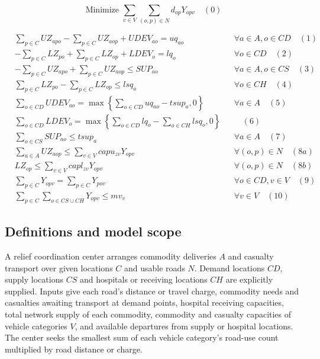 \documentclass[10pt]{article}
\begin{document}
\[
\text{Minimize } \sum_{v \in V} \sum_{(o,p) \in N} d_{op} Y_{opv} \quad (0)
\]

\begin{align}
& \sum_{p \in C} UZ_{apo} - \sum_{p \in C} UZ_{aop} + UDEV_{ao} = uq_{ao} && \forall a \in A, o \in CD \quad (1) \\
& -\sum_{p \in C} LZ_{po} + \sum_{p \in C} LZ_{op} + LDEV_{o} = lq_{o} && \forall o \in CD \quad (2) \\
& -\sum_{p \in C} UZ_{apo} + \sum_{p \in C} UZ_{aop} \leq SUP_{ao} && \forall a \in A, o \in CS \quad (3) \\
& \sum_{p \in C} LZ_{po} - \sum_{p \in C} LZ_{op} \leq lsq_{o} && \forall o \in CH \quad (4) \\
& \sum_{o \in CD} UDEV_{ao} = \max \left\{ \sum_{o \in CD} uq_{ao} - tsup_{a}, 0 \right\} && \forall a \in A \quad (5) \\
& \sum_{o \in CD} LDEV_{o} = \max \left\{ \sum_{o \in CD} lq_{o} - \sum_{o \in CH} lsq_{o}, 0 \right\} && \quad (6) \\
& \sum_{o \in CS} SUP_{ao} \leq tsup_{a} && \forall a \in A \quad (7) \\
& \sum_{a \in A} UZ_{aop} \le \sum_{v \in V} capu_{zv} Y_{opv} && \forall (o, p) \in N \quad (8a) \\
& LZ_{op} \le \sum_{v \in V} capl_{zv} Y_{opv} && \forall (o, p) \in N \quad (8b) \\
& \sum_{p \in C} Y_{opv} = \sum_{p \in C} Y_{pov} && \forall o \in CD, v \in V \quad (9) \\
& \sum_{p \in C} \sum_{o \in CS \cup CH} Y_{opv} \le mv_{v} && \forall v \in V \quad (10)
\end{align}

\subsection*{Definitions and model scope}
A relief coordination center arranges commodity deliveries $A$ and casualty transport over given locations $C$ and usable roads $N$. Demand locations $CD$, supply locations $CS$ and hospitals or receiving locations $CH$ are explicitly supplied. Inputs give each road's distance or travel charge, commodity needs and casualties awaiting transport at demand points, hospital receiving capacities, total network supply of each commodity, commodity and casualty capacities of vehicle categories $V$, and available departures from supply or hospital locations. The center seeks the smallest sum of each vehicle category's road-use count multiplied by road distance or charge.
\end{document}
